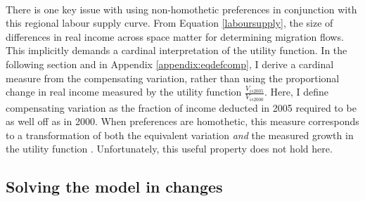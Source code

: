\documentclass[]{article}
\theoremstyle{plain}
\begin{document}
\paragraph*{}
There is one key issue with using non-homothetic preferences in conjunction with this regional labour supply curve. From Equation  \eqref{laboursupply}, the size of differences in real income across space matter for  determining migration flows.  This implicitly demands a cardinal interpretation of the utility function. In the following section and in Appendix \ref{appendix:eqdefcomp}, I derive a cardinal measure from the compensating variation, rather than using the proportional change in real income measured by the utility function $\frac{V_{is2005}}{V_{is2000}}$. Here, I define compensating variation as the fraction of income deducted in 2005 required to be as well off as in 2000. When preferences are homothetic, this measure corresponds to a transformation of both the equivalent variation \textit{and} the measured growth in the utility function \citep{samswamy}. Unfortunately, this useful property does not hold here.



\subsection*{Solving the model in changes}
\end{document}

